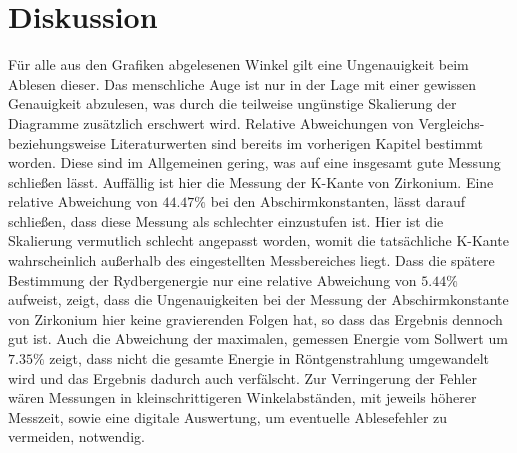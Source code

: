\section{Diskussion}
\label{sec:Diskussion}
Für alle aus den Grafiken abgelesenen Winkel gilt eine Ungenauigkeit beim Ablesen dieser. Das menschliche Auge ist nur in der Lage mit einer
gewissen Genauigkeit abzulesen, was durch die teilweise ungünstige Skalierung der Diagramme zusätzlich erschwert wird.
Relative Abweichungen von Vergleichs- beziehungsweise Literaturwerten sind bereits im vorherigen Kapitel bestimmt worden. Diese sind im Allgemeinen
gering, was auf eine insgesamt gute Messung schließen lässt. Auffällig ist hier die Messung der K-Kante von Zirkonium. Eine relative Abweichung
von $44.47 \%$ bei den Abschirmkonstanten, lässt darauf schließen, dass diese Messung als schlechter einzustufen ist. Hier ist die 
Skalierung vermutlich schlecht angepasst worden, womit die tatsächliche K-Kante wahrscheinlich außerhalb des eingestellten Messbereiches
liegt. Dass die spätere Bestimmung der Rydbergenergie nur eine relative Abweichung von $5.44 \%$ aufweist, zeigt, dass die Ungenauigkeiten bei der Messung der Abschirmkonstante von 
Zirkonium hier keine gravierenden Folgen hat, so dass das Ergebnis dennoch gut ist. Auch die Abweichung der maximalen, gemessen Energie vom Sollwert
um $7.35 \%$ zeigt, dass nicht die gesamte Energie in Röntgenstrahlung umgewandelt wird und das Ergebnis dadurch auch verfälscht. 
Zur Verringerung der Fehler wären Messungen in kleinschrittigeren Winkelabständen, mit jeweils höherer Messzeit, sowie eine digitale 
Auswertung, um eventuelle Ablesefehler zu vermeiden, notwendig. 